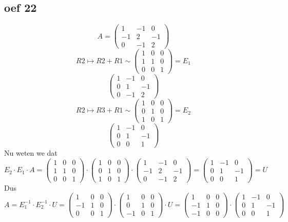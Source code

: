 \documentclass[lineaire_algebra_oplossingen.tex]{subfiles}
\begin{document}
\subsection{oef 22}
\[
A=
\begin{pmatrix}
1 & -1 & 0 \\
-1 & 2 & -1 \\
0 & -1 & 2 
\end{pmatrix}
\]
\[
R2 \longmapsto R2+R1 \sim
\begin{pmatrix}
1 & 0 & 0\\
1 & 1 & 0\\
0 & 0 & 1 
\end{pmatrix}
=E_1
\]
\[
\begin{pmatrix}
1 & -1 & 0 \\
0 & 1 & -1 \\
0 & -1 & 2  
\end{pmatrix}
\]
\[
R2 \longmapsto R3+R1 \sim
\begin{pmatrix}
1 & 0 & 0\\
0 & 1 & 0\\
1 & 0 & 1 
\end{pmatrix}
=E_2
\]
\[
\begin{pmatrix}
1 & -1 & 0 \\
0 & 1 & -1 \\
0 & 0 & 1 
\end{pmatrix}
\]
Nu weten we dat
\[
E_2 \cdot E_1 \cdot A 
=
\begin{pmatrix}
1 & 0 & 0\\
1 & 1 & 0\\
0 & 0 & 1 
\end{pmatrix}
\cdot
\begin{pmatrix}
1 & 0 & 0\\
0 & 1 & 0\\
1 & 0 & 1 
\end{pmatrix}
\cdot
\begin{pmatrix}
1 & -1 & 0 \\
-1 & 2 & -1 \\
0 & -1 & 2 
\end{pmatrix}
=
\begin{pmatrix}
1 & -1 & 0 \\
0 & 1 & -1 \\
0 & 0 & 1 
\end{pmatrix}
= U
\]
Dus
\[
A = E_1^{-1} \cdot E_2^{-1} \cdot U
=
\begin{pmatrix}
1 & 0 & 0\\
-1 & 1 & 0\\
0 & 0 & 1 
\end{pmatrix}
\cdot
\begin{pmatrix}
1 & 0 & 0\\
0 & 1 & 0\\
-1 & 0 & 1 
\end{pmatrix}
\cdot
U
=
\begin{pmatrix}
1 & 0 & 0\\
-1 & 1 & 0\\
-1 & 0 & 0
\end{pmatrix}
\cdot
\begin{pmatrix}
1 & -1 & 0 \\
0 & 1 & -1 \\
0 & 0 & 1 
\end{pmatrix}
\]
\end{document}
